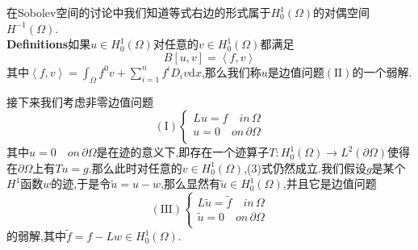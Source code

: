 \documentclass[a4paper,UTF8,12pt]{ctexart}
\begin{document}
在Sobolev空间的讨论中我们知道等式右边的形式属于$H^1_0(\Omega)$的对偶空间$H^{-1}(\Omega)$.\\
\textbf{Definitions}\quad 如果$u\in H^1_0(\Omega)$对任意的$v\in H^1_0(\Omega)$都满足
$$
B[u,v] = \left\langle f,v \right\rangle 
$$
其中$\left\langle f,v \right\rangle =\int_\Omega f^0v+\sum^n_{i=1}f^iD_iv\mathrm{d}x$,那么我们称$u$是边值问题$(\text{II})$的一个弱解.\par
接下来我们考虑非零边值问题
$$
(\text{I})
\begin{cases}
    Lu= f\quad in \, \Omega\\
     u= 0\quad on \, \partial\Omega\\ 
\end{cases}
$$
其中$u= 0\quad on \, \partial\Omega$是在迹的意义下,即存在一个迹算子$T:H^1_0(\Omega)\to L^2(\partial\Omega)$使得在$\partial\Omega$上有$Tu=g$.那么此时对任意的$v\in H^1_0(\Omega)$,(3)式仍然成立.我们假设$g$是某个$H^1$函数$w$的迹,于是令$\tilde{u}=u-w $,那么显然有$\tilde{u}\in H^1_0(\Omega) $,并且它是边值问题
$$
(\text{III})
\begin{cases}
    L\tilde{u} = \tilde{f}\quad in \, \Omega\\
     \tilde{u}= 0\quad on \, \partial\Omega\\ 
\end{cases}
$$
的弱解,其中$\tilde{f}=f-Lw\in H^1_0(\Omega)$.
\end{document}
